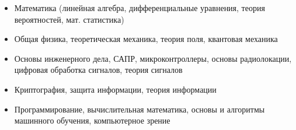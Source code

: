 \documentclass[10pt,a4paper]{cv}
\begin{document}
\begin{itemize}
\item Математика (линейная алгебра, дифференциальные уравнения, теория вероятностей, мат. статистика)
\item Общая физика, теоретическая механика, теория поля, квантовая механика
\item Основы инженерного дела, САПР, микроконтроллеры, основы радиолокации, цифровая обработка сигналов, теория сигналов
\item Криптография, защита информации, теория информации
\item Программирование, вычислительная математика, основы и алгоритмы машинного обучения, компьютерное зрение
\end{itemize}




 

\clearpage
\end{document}
